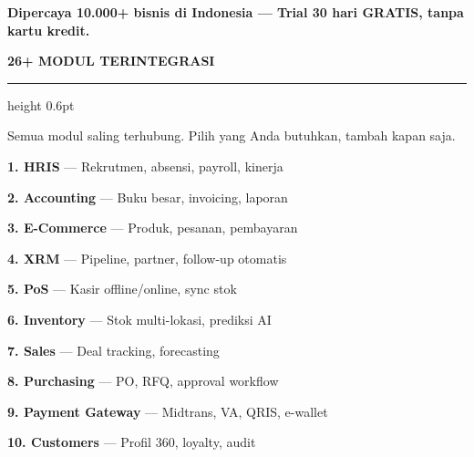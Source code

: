 \documentclass[a4paper]{article}
\newcommand{\sectiontitle}[1]{%
    \vspace{10pt}%
    {\fontsize{13}{16}\selectfont\bfseries\color{BlueDark} #1}\par\vspace{3pt}%
    {\color{BluePrimary}\hrule height 0.6pt}\par\vspace{8pt}%
}
\begin{document}
{\setlength{\fboxsep}{7pt}\setlength{\fboxrule}{0pt}%
\noindent\colorbox{BluePrimary}{%
    \begin{minipage}{\dimexpr\textwidth-2\fboxsep\relax}
        \centering
        {\fontsize{9.5}{12}\selectfont\bfseries\color{White}
        Dipercaya \textbf{10.000+ bisnis} di Indonesia — Trial 30 hari GRATIS, tanpa kartu kredit.}
    \end{minipage}}}

\sectiontitle{26+ MODUL TERINTEGRASI}

{\fontsize{8.5}{11}\selectfont\color{TextLight}Semua modul saling terhubung. Pilih yang Anda butuhkan, tambah kapan saja.}

\noindent
\colorbox{BlueBg}{%
\begin{minipage}[t]{\dimexpr\textwidth-2\fboxsep}
\hspace{6pt}%
\begin{minipage}[t]{0.48\linewidth}
    {\fontsize{9}{12}\selectfont\color{TextDark}%
    \textbf{\color{BluePrimary}1. HRIS} — Rekrutmen, absensi, payroll, kinerja\par\vspace{2pt}%
    \textbf{\color{BluePrimary}2. Accounting} — Buku besar, invoicing, laporan\par\vspace{2pt}%
    \textbf{\color{BluePrimary}3. E-Commerce} — Produk, pesanan, pembayaran\par\vspace{2pt}%
    \textbf{\color{BluePrimary}4. XRM} — Pipeline, partner, follow-up otomatis\par\vspace{2pt}%
    \textbf{\color{BluePrimary}5. PoS} — Kasir offline/online, sync stok\par\vspace{2pt}%
    \textbf{\color{BluePrimary}6. Inventory} — Stok multi-lokasi, prediksi AI\par\vspace{2pt}%
    \textbf{\color{BluePrimary}7. Sales} — Deal tracking, forecasting\par\vspace{2pt}%
    \textbf{\color{BluePrimary}8. Purchasing} — PO, RFQ, approval workflow\par\vspace{2pt}%
    \textbf{\color{BluePrimary}9. Payment Gateway} — Midtrans, VA, QRIS, e-wallet\par\vspace{2pt}%
    \textbf{\color{BluePrimary}10. Customers} — Profil 360\textdegree, loyalty, audit\par\vspace{2pt}%
}
\end{minipage}
\end{minipage}}
\end{document}
